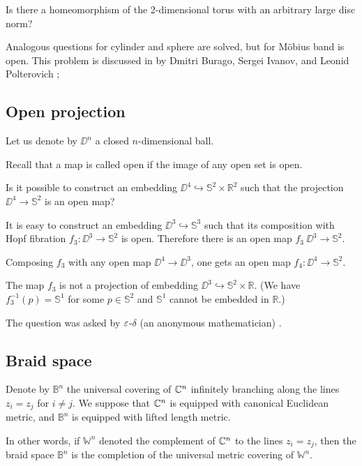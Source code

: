\begin{pr}
Is there a homeomorphism of the 2-dimensional torus with an arbitrary large disc norm?
\end{pr}

Analogous questions for cylinder and sphere are solved, but for M\"obius band is open.
This problem is discussed in by Dmitri Burago, Sergei Ivanov, and Leonid Polterovich \cite{BIP};

\subsection*{Open projection}

Let us denote by $\DD^n$ a closed $n$-dimensional ball.

Recall that a map is called open if the image of any open set is open.

\begin{pr}
Is it possible to construct an embedding $\DD^4\hookrightarrow \mathbb{S}^2\times
\mathbb R^2$
such that the projection  $\DD^4\to \mathbb{S}^2$ is an open map?
\end{pr}


It is easy to construct an embedding $\DD^3\hookrightarrow \mathbb{S}^3$ such that
its composition with Hopf fibration $f_3:\DD^3\to \mathbb{S}^2$ is open.
Therefore there is an open map $f_3\:\DD^3\to\mathbb{S}^2$.

Composing $f_3$ with any open map $\DD^4\to \DD^3$,
one gets an open map $f_4:\DD^4\to \mathbb{S}^2$.

The map $f_3$ is not a projection of embedding  $\DD^3\hookrightarrow \mathbb{S}^2\times\mathbb R$.
(We have $f_3^{-1}(p)=\mathbb{S}^1$ for some $p\in \mathbb{S}^2$ and $\mathbb{S}^1$ cannot be embedded in $\mathbb R$.)  

The question was asked by $\varepsilon$-$\delta$ (an anonymous mathematician)  \cite{epsilon-delta}.

\subsection*{Braid space}

Denote by $\mathbb{B}^n$ the universal covering of $\mathbb{C}^n$ infinitely branching along the lines $z_i=z_j$ for $i\ne j$.
We suppose that $\mathbb{C}^n$ is equipped with canonical Euclidean metric, 
and $\mathbb{B}^n$ is equipped with lifted length metric.

In other words, if $\mathbb{W}^n$ denoted the complement of $\mathbb{C}^n$ to the lines $z_i=z_j$,
then the braid space $\mathbb{B}^n$ is the completion of the universal metric covering of $\mathbb{W}^n$.

